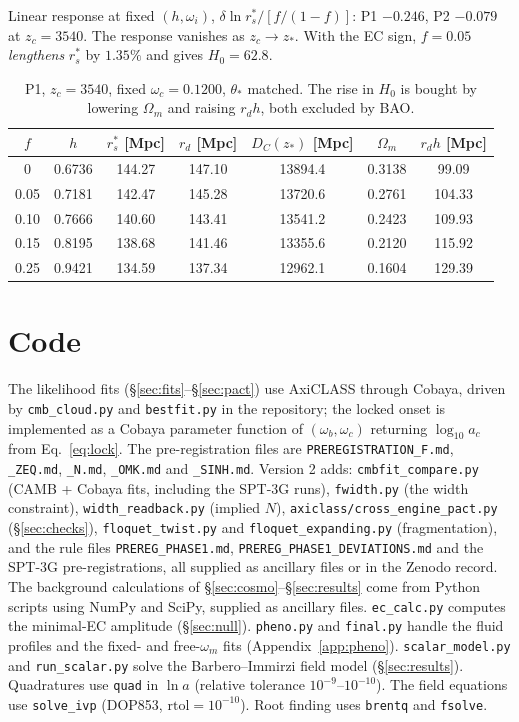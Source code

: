 \documentclass[11pt]{article}
\begin{document}
Linear response at fixed $(h,\omega_i)$, $\delta\ln r_s^*/[f/(1-f)]$: P1 $-0.246$, P2
$-0.079$ at $z_c=3540$. The response vanishes as $z_c\to z_*$. With the EC sign,
$f=0.05$ \emph{lengthens} $r_s^*$ by $1.35\%$ and gives $H_0=62.8$.

\begin{table}[h]
\centering
\begin{tabular}{ccccccc}
\toprule
$f$ & $h$ & $r_s^*$ [Mpc] & $r_d$ [Mpc] & $D_C(z_*)$ [Mpc] & $\Omega_m$ & $r_dh$ [Mpc]\\
\midrule
0    & 0.6736 & 144.27 & 147.10 & 13894.4 & 0.3138 & 99.09\\
0.05 & 0.7181 & 142.47 & 145.28 & 13720.6 & 0.2761 & 104.33\\
0.10 & 0.7666 & 140.60 & 143.41 & 13541.2 & 0.2423 & 109.93\\
0.15 & 0.8195 & 138.68 & 141.46 & 13355.6 & 0.2120 & 115.92\\
0.25 & 0.9421 & 134.59 & 137.34 & 12962.1 & 0.1604 & 129.39\\
\bottomrule
\end{tabular}
\caption{P1, $z_c=3540$, fixed $\omega_c=0.1200$, $\theta_*$ matched. The rise in $H_0$ is
bought by lowering $\Omega_m$ and raising $r_dh$, both excluded by BAO.}
\label{tab:A}
\end{table}

\section{Code}\label{app:code}
\sloppy
The likelihood fits (\S\ref{sec:fits}--\S\ref{sec:pact}) use AxiCLASS through Cobaya, driven by
\texttt{cmb\_cloud.py} and \texttt{bestfit.py} in the repository; the locked onset is
implemented as a Cobaya parameter function of $(\omega_b,\omega_c)$ returning
$\log_{10}a_c$ from Eq.~\eqref{eq:lock}. The pre-registration files are
\texttt{PREREGISTRATION\_F.md}, \texttt{\_ZEQ.md}, \texttt{\_N.md}, \texttt{\_OMK.md} and
\texttt{\_SINH.md}. Version 2 adds: \texttt{cmbfit\_compare.py} (CAMB + Cobaya fits, including the
SPT-3G runs), \texttt{fwidth.py} (the width constraint), \texttt{width\_readback.py} (implied $N$),
\texttt{axiclass/cross\_engine\_pact.py} (\S\ref{sec:checks}), \texttt{floquet\_twist.py} and
\texttt{floquet\_expanding.py} (fragmentation), and the rule files \texttt{PREREG\_PHASE1.md},
\texttt{PREREG\_PHASE1\_DEVIATIONS.md} and the SPT-3G pre-registrations, all supplied as ancillary files
or in the Zenodo record. The background calculations of \S\ref{sec:cosmo}--\S\ref{sec:results} come
from Python scripts using NumPy and SciPy, supplied as ancillary files.
\texttt{ec\_calc.py} computes the minimal-EC amplitude (\S\ref{sec:null}).
\texttt{pheno.py} and \texttt{final.py} handle the fluid profiles and the fixed- and
free-$\omega_m$ fits (Appendix~\ref{app:pheno}). \texttt{scalar\_model.py} and
\texttt{run\_scalar.py} solve the Barbero--Immirzi field model
(\S\ref{sec:results}). Quadratures use \texttt{quad} in $\ln a$ (relative tolerance
$10^{-9}$--$10^{-10}$). The field equations use \texttt{solve\_ivp} (DOP853,
$\mathrm{rtol}=10^{-10}$). Root finding uses \texttt{brentq} and \texttt{fsolve}.
\end{document}
